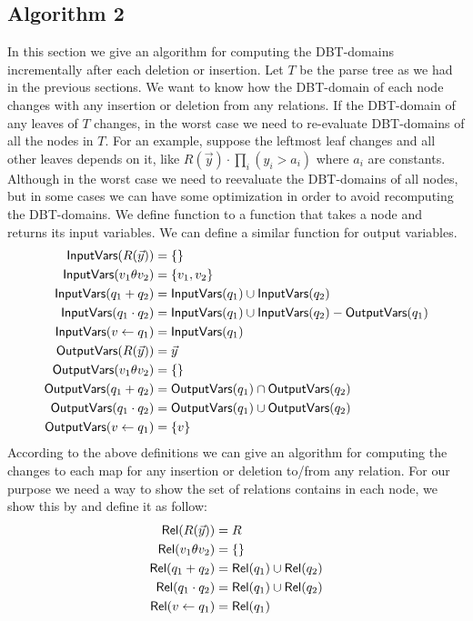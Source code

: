 \documentclass[12pt]{article}
\begin{document}
\subsection{Algorithm 2}
In this section we give an algorithm for computing the DBT-domains incrementally after each deletion or insertion. Let $T$ be the parse tree as we had in the previous sections. We want to know how the DBT-domain of each node changes with any insertion or deletion from any relations. If the DBT-domain of any leaves of $T$ changes, in the worst case we need to re-evaluate DBT-domains of all the nodes in $T$. For an example, suppose the leftmost leaf changes and all other leaves depends on it, like $R(\vec{y})\cdot\prod_{i}{(y_{i}>a_{i})}$ where $a_{i}$ are constants.
Although in the worst case we need to reevaluate the DBT-domains of all nodes, but in some cases we can have some optimization in order to avoid recomputing the DBT-domains. We define function \InputVars{} to a function that takes a node and returns its input variables. We can define a similar function \OutputVars{} for output variables.
\begin{align}
\text{\textsf{InputVars}}(R(\vec{y}))&=\{\}\\
\text{\textsf{InputVars}}(v_{1}\theta v_{2})&=\{v_{1},v_{2}\}\\
\text{\textsf{InputVars}}(q_{1}+q_{2})&=\text{\textsf{InputVars}}(q_{1})\cup\text{\textsf{InputVars}}(q_{2})\\
\text{\textsf{InputVars}}(q_{1}\cdot q_{2})&=\text{\textsf{InputVars}}(q_{1})\cup\text{\textsf{InputVars}}(q_{2})-\text{\textsf{OutputVars}}(q_{1})\\
\text{\textsf{InputVars}}(v\gets q_{1})&=\text{\textsf{InputVars}}(q_{1})\\
\text{\textsf{OutputVars}}(R(\vec{y}))&=\vec{y}\\
\text{\textsf{OutputVars}}(v_{1}\theta v_{2})&=\{\}\\
\text{\textsf{OutputVars}}(q_{1}+q_{2})&=\text{\textsf{OutputVars}}(q_{1})\cap\text{\textsf{OutputVars}}(q_{2})\\
\text{\textsf{OutputVars}}(q_{1}\cdot q_{2})&=\text{\textsf{OutputVars}}(q_{1})\cup\text{\textsf{OutputVars}}(q_{2})\\
\text{\textsf{OutputVars}}(v\gets q_{1})&=\{v\}
\end{align}
According to the above definitions we can give an algorithm for computing the changes to each map for any insertion or deletion to/from any relation. For our purpose we need a way to show the set of relations contains in each node, we show this by \Rel{} and define it as follow:
\begin{align}
\text{\textsf{Rel}}(R(\vec{y}))&=R\\
\text{\textsf{Rel}}(v_{1}\theta v_{2})&=\{\}\\
\text{\textsf{Rel}}(q_{1}+q_{2})&=\text{\textsf{Rel}}(q_{1})\cup\text{\textsf{Rel}}(q_{2})\\
\text{\textsf{Rel}}(q_{1}\cdot q_{2})&=\text{\textsf{Rel}}(q_{1})\cup\text{\textsf{Rel}}(q_{2})\\
\text{\textsf{Rel}}(v\gets q_{1})&=\text{\textsf{Rel}}(q_{1})
\end{align}
\end{document}
